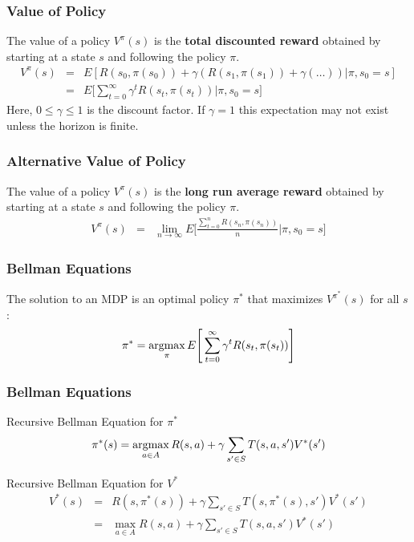 \documentclass[ignorenonframetext]{beamer}
\newcommand{\argmax}{\operatornamewithlimits{argmax}}
\begin{document}
\begin{frame}
	\frametitle{Value of Policy}
		The value of a policy $V^\pi(s)$ is the \textbf{total discounted
		reward} obtained by starting at a state $s$ and following the
		policy $\pi$.
		\begin{eqnarray*}	
			V^\pi(s) &=& E[R(s_0,\pi(s_0)) + \gamma (R(s_1,\pi(s_1)) + \gamma( \dots
			)) | \pi, s_0 = s]\\
			&=& E \Bigg[\sum_{t=0}^\infty \gamma^t R(s_t,\pi(s_t)) \Big| \pi, s_0 =
			s  \Bigg]
		\end{eqnarray*}	
		Here, $0 \leq \gamma \leq 1$ is the discount factor. If $\gamma =
		1$ this expectation may not exist unless the horizon is finite.
\end{frame}

\begin{frame}
	\frametitle{Alternative Value of Policy}
		The value of a policy $V^\pi(s)$ is the \textbf{long run average
		reward} obtained by starting at a state $s$ and following the
		policy $\pi$.
		\begin{eqnarray*}	
			V^\pi(s) &=& \lim_{n \to \infty} E\Bigg[\frac{\sum_{t=0}^n
			R(s_n,\pi(s_n))}{n}\Big| \pi, s_0 = s\Bigg]
		\end{eqnarray*}	
\end{frame}

\begin{frame}
	\frametitle{Bellman Equations}
	The solution to an MDP is an optimal policy $\pi^*$ that maximizes
	$V^{\pi^*}(s)$ for all $s$:
	\[
	\pi^* = \argmax_{\pi} E\Bigg[\sum_{t=0}^\infty \gamma^t
	R(s_t,\pi(s_t))\Bigg] 
	\]
\end{frame}

\begin{frame}
	\frametitle{Bellman Equations}
	\begin{block}{Recursive Bellman Equation for $\pi^*$}
		\[
		\pi^*(s) = \argmax_{a\in A} R(s,a) + \gamma \sum_{s'\in S} T(s,a,s')V^*(s')
		\]
	\end{block}
	\begin{block}{Recursive Bellman Equation for $V^*$ \footnotemark}
		\begin{eqnarray*}
			V^*(s) &=& R(s,\pi^*(s)) + \gamma \sum_{s' \in S}T(s,\pi^*(s),
			s') V^*(s')\\
			&=& \max_{a \in A} R(s,a) + \gamma \sum_{s' \in S}T(s,a, s') V^*(s')
		\end{eqnarray*}
	\end{block}
\end{frame}
\end{document}
